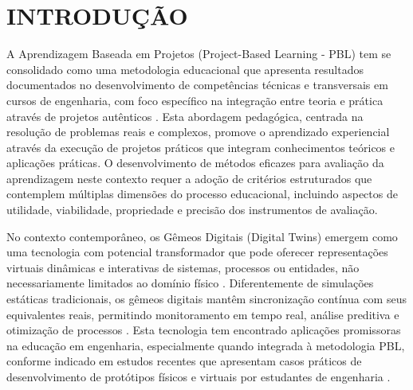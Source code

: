 \documentclass[12pt, a4paper, oneside, brazilian]{abntex2}
\begin{document}
\tableofcontents

\textual
\onehalfspacing

\section{INTRODUÇÃO}

A Aprendizagem Baseada em Projetos (Project-Based Learning - PBL) tem se consolidado como uma metodologia educacional que apresenta resultados documentados no desenvolvimento de competências técnicas e transversais em cursos de engenharia, com foco específico na integração entre teoria e prática através de projetos autênticos \cite{zhang2023, lavado2024, guo2020}. Esta abordagem pedagógica, centrada na resolução de problemas reais e complexos, promove o aprendizado experiencial através da execução de projetos práticos que integram conhecimentos teóricos e aplicações práticas. O desenvolvimento de métodos eficazes para avaliação da aprendizagem neste contexto requer a adoção de critérios estruturados que contemplem múltiplas dimensões do processo educacional, incluindo aspectos de utilidade, viabilidade, propriedade e precisão dos instrumentos de avaliação.

No contexto contemporâneo, os Gêmeos Digitais (Digital Twins) emergem como uma tecnologia com potencial transformador que pode oferecer representações virtuais dinâmicas e interativas de sistemas, processos ou entidades, não necessariamente limitados ao domínio físico \cite{grieves2014, tao2018}. Diferentemente de simulações estáticas tradicionais, os gêmeos digitais mantêm sincronização contínua com seus equivalentes reais, permitindo monitoramento em tempo real, análise preditiva e otimização de processos \cite{silveira2024panorama}. Esta tecnologia tem encontrado aplicações promissoras na educação em engenharia, especialmente quando integrada à metodologia PBL, conforme indicado em estudos recentes que apresentam casos práticos de desenvolvimento de protótipos físicos e virtuais por estudantes de engenharia \cite{bachmann2023}.
\end{document}
